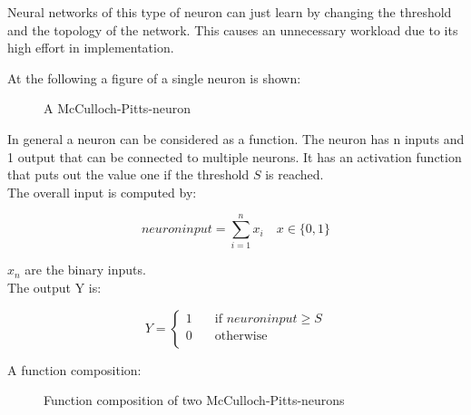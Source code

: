 \documentclass[10pt,a4paper,DIV=11]{scrreprt}
\begin{document}
Neural networks of this type of neuron can just learn by changing the threshold and the topology of the network. This causes an unnecessary workload due to its high effort in implementation.

At the following a figure of a single neuron is shown:

\begin{figure}[H]  %
	\centering
	\caption{A McCulloch-Pitts-neuron}
	\label{fig:pitts1}
\end{figure}

In general a neuron can be considered as a function.
The neuron has n inputs and 1 output that can be connected to multiple neurons. It has an activation function that puts out the value one if the threshold $S$ is reached. \\

The overall input is computed by:

\begin{equation}
neuroninput = \sum_{i=1}^{n} x_{i} \quad  x \in \{0, 1\}
\end{equation}

$x_{n}$ are the binary inputs. \\

The output Y is:


\[ Y =
\begin{cases}
1       & \quad \text{if } neuroninput  \geq S \\
0  & \quad \text{otherwise}\\
\end{cases}
\]





A function composition:

\begin{figure}[H]
	\centering
	\caption{Function composition of two McCulloch-Pitts-neurons}
	\label{fig:pitts2}
\end{figure}
\end{document}
